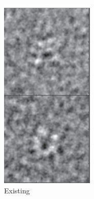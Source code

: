\documentclass{beamer}
\begin{document}
\begin{frame}
\begin{columns}
\begin{figure}
\centering
\includegraphics[width=.8 \columnwidth]{figures/deneg_twf.png}
\caption{Existing}
\end{figure}


\end{columns}
\end{frame}
\end{document}
